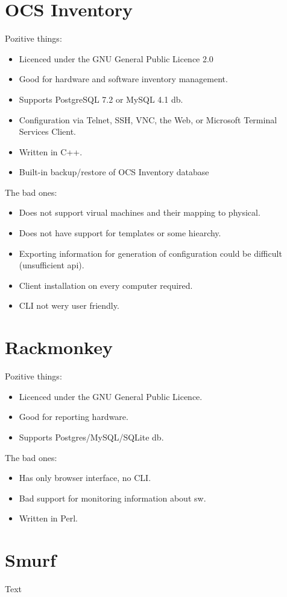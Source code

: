 \documentclass[12pt]{article}
\begin{document}
\section{OCS Inventory}
Pozitive things:
\begin{itemize}
\item Licenced under the GNU General Public Licence 2.0
\item Good for hardware and software inventory management.
\item Supports PostgreSQL 7.2 or MySQL 4.1 db.
\item Configuration via Telnet, SSH, VNC, the Web, or Microsoft Terminal Services Client.
\item Written in C++.
\item Built-in backup/restore of OCS Inventory database
\end{itemize}


The bad ones:
\begin{itemize}
\item Does not support virual machines and their mapping to physical.
\item Does not have support for templates or some hiearchy.
\item Exporting information for generation of configuration could be difficult (unsufficient api). %
\item Client installation on every computer required.
\item CLI not wery user friendly.
\end{itemize}




\section{Rackmonkey}
Pozitive things:
\begin{itemize}
\item Licenced under the GNU General Public Licence.
\item Good for reporting hardware.
\item Supports Postgres/MySQL/SQLite db.
\end{itemize}


The bad ones:
\begin{itemize}
\item Has only browser interface, no CLI.
\item Bad support for monitoring information about sw.
\item Written in Perl.
\end{itemize}



\section{Smurf}
Text
\end{document}
